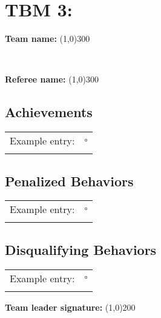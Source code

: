 \section*{TBM 3: }
\vspace{0.5cm} \begin{large} \textbf{Team name:} \line(1,0){300} \end{large} \vspace{0.7cm} \\ 
\vspace{0.5cm} \begin{large} \textbf{Referee name:} \line(1,0){300} \end{large} \vspace{0.2cm}

\subsection*{Achievements}
\begin{tabular}{ l c}
Example entry: & $\square$ \\ \\
\end{tabular}

\subsection*{Penalized Behaviors}
\begin{tabular}{ l c}
Example entry: & $\square$ \\ \\
\end{tabular}

\subsection*{Disqualifying Behaviors}
\begin{tabular}{ l c}
Example entry: & $\square$ \\ \\
\end{tabular}

\vspace{1.5cm}
\begin{large}
\textbf{Team leader signature:}
\line(1,0){200}
\end{large}